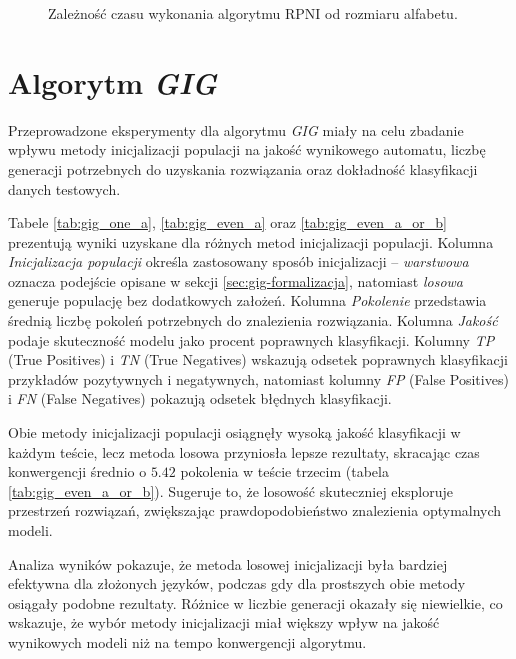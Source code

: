 \begin{figure}[h]
\centering
{}
\caption{Zależność czasu wykonania algorytmu RPNI od rozmiaru alfabetu.}
\label{fig:rpni_time}
\end{figure}


\section{Algorytm \textit{GIG}}  
Przeprowadzone eksperymenty dla algorytmu \textit{GIG} miały na celu zbadanie wpływu metody inicjalizacji populacji na jakość wynikowego automatu, liczbę generacji potrzebnych do uzyskania rozwiązania oraz dokładność klasyfikacji danych testowych.

Tabele \ref{tab:gig_one_a}, \ref{tab:gig_even_a} oraz \ref{tab:gig_even_a_or_b} prezentują wyniki uzyskane dla różnych metod inicjalizacji populacji. Kolumna \textit{Inicjalizacja populacji} określa zastosowany sposób inicjalizacji – \textit{warstwowa} oznacza podejście opisane w sekcji \ref{sec:gig-formalizacja}, natomiast \textit{losowa} generuje populację bez dodatkowych założeń. Kolumna \textit{Pokolenie} przedstawia średnią liczbę pokoleń potrzebnych do znalezienia rozwiązania. Kolumna \textit{Jakość} podaje skuteczność modelu jako procent poprawnych klasyfikacji. Kolumny \textit{TP} (True Positives) i \textit{TN} (True Negatives) wskazują odsetek poprawnych klasyfikacji przykładów pozytywnych i negatywnych, natomiast kolumny \textit{FP} (False Positives) i \textit{FN} (False Negatives) pokazują odsetek błędnych klasyfikacji.

Obie metody inicjalizacji populacji osiągnęły wysoką jakość klasyfikacji w każdym teście, lecz metoda losowa przyniosła lepsze rezultaty, skracając czas konwergencji średnio o $5.42$ pokolenia w teście trzecim (tabela \ref{tab:gig_even_a_or_b}). Sugeruje to, że losowość skuteczniej eksploruje przestrzeń rozwiązań, zwiększając prawdopodobieństwo znalezienia optymalnych modeli. 

Analiza wyników pokazuje, że metoda losowej inicjalizacji była bardziej efektywna dla złożonych języków, podczas gdy dla prostszych obie metody osiągały podobne rezultaty. Różnice w liczbie generacji okazały się niewielkie, co wskazuje, że wybór metody inicjalizacji miał większy wpływ na jakość wynikowych modeli niż na tempo konwergencji algorytmu.


